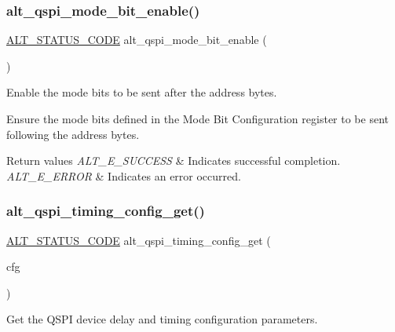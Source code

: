 \subsubsection{\texorpdfstring{alt\_qspi\_mode\_bit\_enable()}{alt\_qspi\_mode\_bit\_enable()}}
{\footnotesize\ttfamily \mbox{\hyperlink{hwlib_8h_abdb0d369f069723ca55d6c94bcaaaa12}{A\+L\+T\+\_\+\+S\+T\+A\+T\+U\+S\+\_\+\+C\+O\+DE}} alt\+\_\+qspi\+\_\+mode\+\_\+bit\+\_\+enable (\begin{DoxyParamCaption}\item[{void}]{ }\end{DoxyParamCaption})}

Enable the mode bits to be sent after the address bytes.

Ensure the mode bits defined in the Mode Bit Configuration register to be sent following the address bytes.


\begin{DoxyRetVals}{Return values}
{\em A\+L\+T\+\_\+\+E\+\_\+\+S\+U\+C\+C\+E\+SS} & Indicates successful completion. \\
\hline
{\em A\+L\+T\+\_\+\+E\+\_\+\+E\+R\+R\+OR} & Indicates an error occurred. \\
\hline
\end{DoxyRetVals}
\mbox{\label{group__ALT__QSPI__DEV__CFG_ga5f89298f2ed75c53da574d53cfbd747a}} 
\subsubsection{\texorpdfstring{alt\_qspi\_timing\_config\_get()}{alt\_qspi\_timing\_config\_get()}}
{\footnotesize\ttfamily \mbox{\hyperlink{hwlib_8h_abdb0d369f069723ca55d6c94bcaaaa12}{A\+L\+T\+\_\+\+S\+T\+A\+T\+U\+S\+\_\+\+C\+O\+DE}} alt\+\_\+qspi\+\_\+timing\+\_\+config\+\_\+get (\begin{DoxyParamCaption}\item[{\mbox{\hyperlink{group__ALT__QSPI__DEV__CFG_ga81b5f892a981d0ecb8fb454b3a1e1230}{A\+L\+T\+\_\+\+Q\+S\+P\+I\+\_\+\+T\+I\+M\+I\+N\+G\+\_\+\+C\+O\+N\+F\+I\+G\+\_\+t}} $\ast$}]{cfg }\end{DoxyParamCaption})}

Get the Q\+S\+PI device delay and timing configuration parameters.

